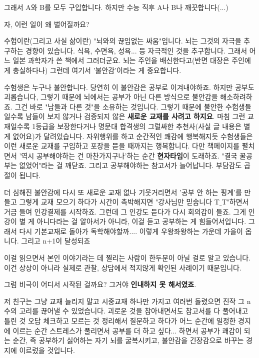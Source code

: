 그래서 A와 B를 모두 구입합니다. 하지만 수능 직후 A나 B나 깨끗합니다(...)
\vspace{5mm}

자, 이런 일이 왜 벌어질까요?
\vspace{5mm}

수험이란(그리고 사실 삶이란) "뇌와의 끊임없는 싸움"입니다.
뇌는 그것의 자극을 추구하는 경향이 있습니다. 식욕, 수면욕, 성욕... 등 자극적인 것을 추구합니다.
그래서 어느 일본 과학자가 쓴 책에서 그러더군요. 뇌는 주인을 배신한다고(반면 대장은 주인에게 충실하다나)
그런데 여기서 '불안감'이라는 게 중요합니다.
\vspace{5mm}

수험생은 누구나 불안합니다. 당연히 이 불안감은 공부로 이겨내야하죠.
하지만 공부도 괴롭습니다, 그렇기 때문에 뇌에서는 공부가 아닌 다른 방식으로 불안감을 해소하려하죠.
그건 바로 "남들과 다른 것"을 소유하는 것입니다.
그렇기 때문에 불안한 수험생들일수록 남들이 보지 않거나 검증되지 않은 \textbf{새로운 교재를 사려고 하지요}.
마침 그런 교재일수록 1등급을 보장한다거나 명문대 합격생의 그럴싸한 추천사(사실 글 내용은 별 게 없어요)가 달려있습니다.
자위행위를 하고 순간적인 쾌감에 행복해지듯 수험생들은 이런 새로운 교재를 구입하고 포장을 뜯을 때까지는 행복합니다.
다만 책페이지를 펼치면서 '역시 공부해야하는 건 마찬가지구나'하는 순간 \textbf{현자타임}이 도래하죠.
"결국 꿀공부는 없었어"라는 걸 깨닫죠. 그리고 공부해야하는 참고서가 늘어납니다. 부담감도 곱절이 됩니다.
\vspace{5mm}

더 심해진 불안감에 다시 또 새로운 교재 없나 기웃거리면서 '공부 안 하는 핑계'를 만들고
그렇게 교재 모으기 하다가 시간이 촉박해지면 "강사님만 믿숩니다 T$\_$T"하면서 거금 들여 인강결제를 시작하죠.
그런데 그 인강도 듣다가 다시 회의감이 들죠. 그게 인강이 별 게 아니다라는 걸 알아서가 아니라, 이걸 듣고 공부하는 게 힘들어서입니다.
그래서 다시 기본교재로 돌아가 독학해야할까.... 이렇게 우왕좌왕하는 가운데 가을이 옵니다. 그리고 n+1이 달성되죠
\vspace{5mm}

이걸 읽으면서 본인 이야기라는 데 찔리는 사람이 한두분이 아닐 걸로 알고 있습니다.
이건 상상이 아니라 실제로 관찰, 상담에서 적지않게 확인된 사례이기 때문입니다.
\vspace{5mm}

그럼 비극이 어디서 시작된 걸까요?
그거야 \textbf{인내하지 못 해서였죠}.
\vspace{5mm}

저 친구는 그냥 교재 늘리지 말고 시중교재 하나만 가지고 여러번 돌렸으면 진작 그 n수의 고리를 끊어낼 수 있었습니다.
괴로운 것을 참아내면서도 참고서를 다 풀어내고 틀린 것 오답 체크하고 모르는 것 정리해서 질문하고 하다가
어느 순간에 일정한 경지에 이르는 순간 스트레스가 풀리면서 공부를 더 하고 싶다... 하면서 공부가 쾌감이 되는 순간,
즉 공부하기 싫어하는 자기 뇌를 굴복시키고, 불안감을 긴장감으로 바꾸는 경지에 이르렀을 것입니다.
\vspace{5mm}

